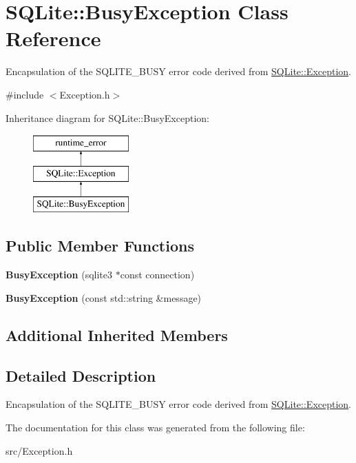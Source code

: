 \hypertarget{class_s_q_lite_1_1_busy_exception}{\section{S\-Q\-Lite\-:\-:Busy\-Exception Class Reference}
\label{class_s_q_lite_1_1_busy_exception}
}


Encapsulation of the S\-Q\-L\-I\-T\-E\-\_\-\-B\-U\-S\-Y error code derived from \hyperlink{class_s_q_lite_1_1_exception}{S\-Q\-Lite\-::\-Exception}.  




{\ttfamily \#include $<$Exception.\-h$>$}

Inheritance diagram for S\-Q\-Lite\-:\-:Busy\-Exception\-:\begin{figure}[H]
\begin{center}
\leavevmode
\includegraphics[height=3.000000cm]{class_s_q_lite_1_1_busy_exception}
\end{center}
\end{figure}
\subsection*{Public Member Functions}
\begin{DoxyCompactItemize}
\item 
\hypertarget{class_s_q_lite_1_1_busy_exception_ac6679ad9fcb996ce723941c7b590603e}{{\bfseries Busy\-Exception} (sqlite3 $\ast$const connection)}\label{class_s_q_lite_1_1_busy_exception_ac6679ad9fcb996ce723941c7b590603e}

\item 
\hypertarget{class_s_q_lite_1_1_busy_exception_aab5d5d7fd7dacb68eca8c9ceceb50619}{{\bfseries Busy\-Exception} (const std\-::string \&message)}\label{class_s_q_lite_1_1_busy_exception_aab5d5d7fd7dacb68eca8c9ceceb50619}

\end{DoxyCompactItemize}
\subsection*{Additional Inherited Members}


\subsection{Detailed Description}
Encapsulation of the S\-Q\-L\-I\-T\-E\-\_\-\-B\-U\-S\-Y error code derived from \hyperlink{class_s_q_lite_1_1_exception}{S\-Q\-Lite\-::\-Exception}. 



The documentation for this class was generated from the following file\-:\begin{DoxyCompactItemize}
\item 
src/Exception.\-h\end{DoxyCompactItemize}
